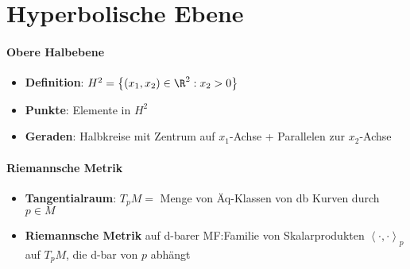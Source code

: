\section{Hyperbolische Ebene}

\paragraph{Obere Halbebene}
\begin{itemize}
  \item \textbf{Definition}: \( H^2 = \left \{ (x_1,x_2) \in \R^2 : x_2 > 0 \right \} \)
  \item \textbf{Punkte}: Elemente in \( H^2 \)
  \item \textbf{Geraden}: Halbkreise mit Zentrum auf \( x_1 \)-Achse + Parallelen zur \( x_2 \)-Achse
\end{itemize}

\paragraph{Riemannsche Metrik}
\begin{itemize}
  \item \textbf{Tangentialraum}: \( T_p M = \) Menge von Äq-Klassen von db Kurven durch \( p \in M \)
  \item \textbf{Riemannsche Metrik} auf d-barer MF:\@ Familie von Skalarprodukten \( \left\langle \cdot, \cdot \right\rangle_p \) auf \( T_p M \), die d-bar von \( p \) abhängt
\end{itemize}

